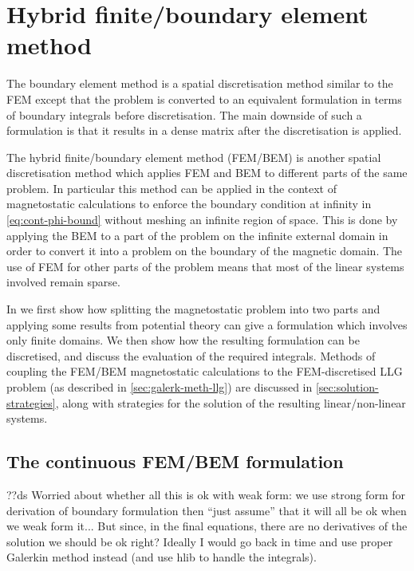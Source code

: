 \newcommand{\bmop}{\mathcal{G}}

\chapter{Hybrid finite/boundary element method}
\label{sec:hybr-finit-elem}

The boundary element method is a spatial discretisation method similar to the FEM except that the problem is converted to an equivalent formulation in terms of boundary integrals before discretisation.
The main downside of such a formulation is that it results in a dense matrix after the discretisation is applied.

The hybrid finite/boundary element method (FEM/BEM) is another spatial discretisation method which applies FEM and BEM to different parts of the same problem.
In particular this method can be applied in the context of magnetostatic calculations to enforce the boundary condition at infinity in \cref{eq:cont-phi-bound} without meshing an infinite region of space.
This is done by applying the BEM to a part of the problem on the infinite external domain in order to convert it into a problem on the boundary of the magnetic domain.
The use of FEM for other parts of the problem means that most of the linear systems involved remain sparse.

In  we first show how splitting the magnetostatic problem into two parts and applying some results from potential theory can give a formulation which involves only finite domains.
We then show how the resulting formulation can be discretised, and discuss the evaluation of the required integrals.
Methods of coupling the FEM/BEM magnetostatic calculations to the FEM-discretised LLG problem (as described in \cref{sec:galerk-meth-llg}) are discussed in \cref{sec:solution-strategies}, along with strategies for the solution of the resulting linear/non-linear systems.


\section{The continuous FEM/BEM formulation}
\label{sec:bem-derivation}


??ds Worried about whether all this is ok with weak form: we use strong form for derivation of boundary formulation then ``just assume'' that it will all be ok when we weak form it...
But since, in the final equations, there are no derivatives of the solution we should be ok right?
Ideally I would go back in time and use proper Galerkin method instead (and use hlib to handle the integrals).

